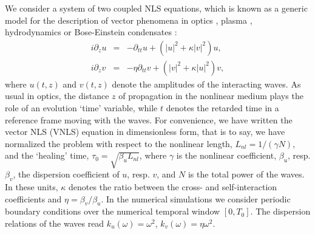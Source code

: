 \documentclass[pra,twocolumn,showpacs,preprintnumbers,amsmath,amssymb]{revtex4}
\begin{document}
We consider a system of two coupled NLS equations, which is known as a generic model for the description of vector phenomena in optics \cite{AgrawKivshar}, plasma \cite{vnls_plasma}, hydrodynamics \cite{vnls_hydro} or Bose-Einstein condensates \cite{vnls_bec}:
\begin{eqnarray}
 i\partial_z u &=& -  \partial_{tt} u +   (|u|^2 + \kappa |v|^2) u,
\label{eq:nls_u} \\
 i\partial_z v &=& - \eta \partial_{tt} v + (|v|^2 + \kappa |u|^2) v,
\label{eq:nls_v}
\end{eqnarray}
where $u(t,z)$ and $v(t,z)$ denote the amplitudes of the interacting waves. 
As usual in optics, the distance $z$ of propagation in the nonlinear medium plays the role of an evolution `time' variable, while $t$ denotes the retarded time in a reference frame moving with the waves. 
For convenience, we have written the vector NLS (VNLS)  equation in dimensionless form, that is to say, we have normalized the problem with respect to the nonlinear length, $L_{nl}=1/(\gamma N)$, and the `healing' time, $\tau_0=\sqrt{\beta_u L_{nl}}$, where $\gamma$ is the nonlinear coefficient, $\beta_{u}$, resp. $\beta_{v}$, the dispersion coefficient of $u$, resp. $v$, and $N$ is the total power of the waves.
In these units, $\kappa$ denotes the ratio between the cross- and self-interaction coefficients and $\eta=\beta_v/\beta_u$. 
In the numerical simulations we consider periodic boundary conditions over the numerical temporal window $[0,T_0]$. 
The dispersion relations of the waves read $k_{u}(\omega) = \omega^2$, $k_{v}(\omega) = \eta \omega^2$.
\end{document}
